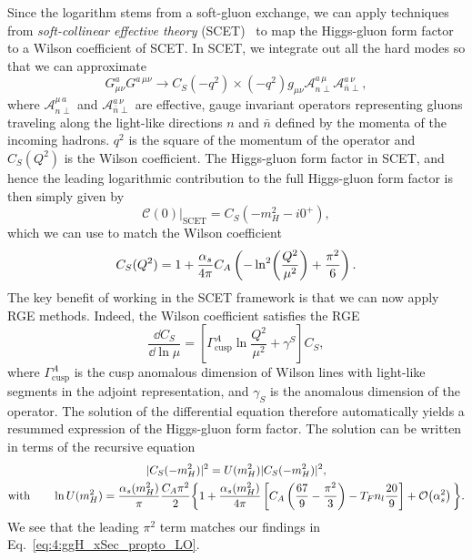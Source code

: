 Since the logarithm stems from a soft-gluon exchange, we can apply techniques from \textit{soft-collinear effective theory} (\acs{SCET})~\cite{Bauer:2001yt, Bauer:2002nz} to map the Higgs-gluon form factor to a Wilson coefficient of \acs{SCET}. In \acs{SCET}, we integrate out all the hard modes so that we can approximate
\begin{equation}
G_{\mu \nu}^a G^{a\, \mu \nu} \longrightarrow C_S(-q^2) \times (-q^2) g_{\mu \nu} \mathcal{A}_{n \perp}^{a \, \mu} \mathcal{A}_{\bar{n}\perp}^{a \, \nu},
\end{equation}
where $\mathcal{A}_{n \perp}^{\mu\, a}$ and $\mathcal{A}_{\bar{n}\perp}^{a \, \nu}$ are effective, gauge invariant operators representing gluons traveling along the light-like directions $n$ and $\bar{n}$ defined by the momenta of the incoming hadrons. $q^2$ is the square of the momentum of the operator and $C_S(Q^2)$ is the Wilson coefficient. The Higgs-gluon form factor in \acs{SCET}, and hence the leading logarithmic contribution to the full Higgs-gluon form factor is then simply given by
\begin{equation}
\mathcal{C}(0) \Big \vert_{\mathrm{SCET}} = C_S (-m_H^2 - i 0^+),
\end{equation}
which we can use to match the Wilson coefficient
\begin{equation}
C_S(Q^2) = 1 + \frac{\alpha_s}{4 \pi} C_A \left( - \ln^2\!\left(\frac{Q^2}{\mu^2}\right) + \frac{\pi^2}{6} \right).
\end{equation}
The key benefit of working in the \acs{SCET} framework is that we can now apply \acs{RGE} methods. Indeed, the Wilson coefficient satisfies the \acs{RGE}
\begin{equation}
\frac{\dd C_S}{\dd \ln \mu} = \left[ \Gamma^A_{\mathrm{cusp}} \ln \frac{Q^2}{\mu^2} + \gamma^S \right] C_S,
\end{equation}
where $\Gamma^A_{\mathrm{cusp}}$ is the cusp anomalous dimension of Wilson lines with light-like segments in the adjoint representation, and $\gamma_S$ is the anomalous dimension of the operator. The solution of the differential equation therefore automatically yields a resummed expression of the Higgs-gluon form factor. The solution can be written in terms of the recursive equation
\begin{equation}
\begin{gathered}
|C_S(-m_H^2)|^2 = U(m_H^2) |C_S(-m_H^2)|^2,  \\
\text{with} \qquad \ln U(m_H^2) = \frac{\alpha_s (m_H^2)}{\pi}\frac{C_A \pi^2 }{2} \bigg \lbrace 1 + \frac{\alpha_s(m_H^2)}{4 \pi} \left[C_A \left(\frac{67}{9} - \frac{\pi^2}{3} \right) - T_F n_l \frac{20}{9} \right] + \mathcal{O}\!\left(\alpha_s^2\right) \bigg \rbrace.
\end{gathered}
\end{equation}
We see that the leading $\pi^2$ term matches our findings in Eq.~\eqref{eq:4:ggH_xSec_propto_LO}.

